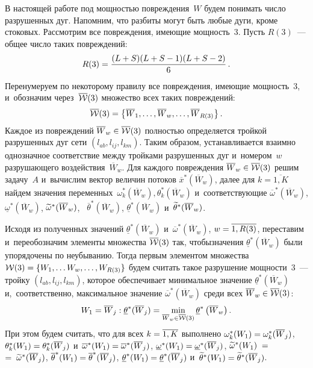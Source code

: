 \begin{multicols}{2}
В настоящей работе под мощностью повреждения~$W$ будем 
понимать число разрушенных дуг. Напомним, что разбиты могут быть любые дуги, 
кроме стоковых. Рассмотрим все повреждения, имеющие мощность~3.
Пусть $R(3)$~--- общее число таких повреждений:
$$
R(3) = \displaystyle\frac{\displaystyle (L+S) (L+S - 1) (L+S - 2)\mathstrut}{\displaystyle 6\mathstrut}\,. 
$$
Перенумеруем по некоторому правилу все по\-вреж\-де\-ния, имеющие мощность~3, 
и~обозначим через~$\overline{\cal W}(3)$ множество  всех таких повреждений: 
$$
\overline{\cal W}(3) = \left\{ \overline W_1, \ldots, 
\overline {W}_w, \ldots, \overline {W}_{R(3)}\right\}. 
$$
Каждое из повреждений $\overline {W}_w \hm\in \overline{\cal W}(3)$ 
пол\-ностью определяется тройкой разрушенных дуг сети $(l_{ab}, l_{ij}, l_{km})$.
Таким образом, устанавливается  взаимно однозначное соответствие между 
тройками разрушенных дуг и~номером~$w$ разрушающего воздействия~$\overline {W}_w$.
Для каждого повреждения $\overline {W}_w \hm\in \overline{\cal W}(3)$ решим задачу~$A$ и~вычислим вектор величин потоков $\overline {x}^*(\overline {W}_w)$, 
далее для $k = \overline{1, K}$ найдем значения переменных~$\omega_k^*(\overline{W}_w), 
\theta_k^*(\overline{W}_w)$  и~со\-от\-вет\-ст\-ву\-ющие $\overline {\omega}^*
(\overline {W}_w)$,  $\underline{\omega}^*(\overline {W}_w)$, 
$\widetilde {\omega}^*(\overline{W}_w)$, \ $\overline {\theta}^*(\overline {W}_w)$, 
$\underline {\theta}^*(\overline {W}_w)$ и~$\widetilde {\theta}^*(\overline {W}_w)$.

Исходя из полученных значений $\underline {\theta}^*(\overline {W}_w)$ 
и~$\overline {\omega}^*(\overline {W}_w)$, $w \hm= \overline{1, R(3)}$, 
переставим и~пе\-ре\-обозначим элементы множества $\overline{\cal W}(3)$ 
так, чтобы\linebreak значения $\underline {\theta}^*(\overline {W}_w)$ 
были упорядочены по неубыванию. Тогда первым элементом множества 
${\cal W}(3) \hm= \{ W_1, \ldots W_w, \ldots, W_{R(3)} \}$ 
будем считать такое разрушение мощности~3~--- тройку $(l_{ab}, l_{ij}, l_{km})$,\linebreak 
которое обеспечивает минимальное значение $\underline {\theta}^*(\overline {W}_w)$ 
и,~соответственно, максимальное значение $\overline {\omega}^*(\overline {W}_w)$ 
среди всех $\overline {W}_w \in \overline{\cal W}(3)$:
$$
W_1 = \overline {W}_j:  \underline {\theta}^*(\overline {W}_j) = 
\min\limits_{\overline {W}_w \in \overline{\cal W}(3)} \underline {\theta}^*
\left(\overline {W}_w\right). 
$$
При этом будем считать, что для всех $k \hm= \overline{1, K}$   
выполнено  $\omega_k^*(W_1) \hm= \omega_k^*(\overline {W}_{j})$, 
$\theta_k^*( W_1) \hm= \theta_k^*(\overline {W}_{j})$
и~$\overline {\omega}^*(W_1) \hm= \overline {\omega}^*(\overline {W}_{j})$, 
$\underline {\omega}^*( W_1)\hm = \underline {\omega}^*(\overline {W}_{j})$, 
$\widetilde {\omega}^*(W_{1})\;=$
$=\;\widetilde {\omega}^*(\overline {W}_{j})$, 
$\overline {\theta}^*(W_{1}) \hm= \overline {\theta}^*(\overline {W}_{j})$, 
$\underline {\theta}^*(W_{1}) \hm= \underline {\theta}^*(\overline {W}_{j})$ 
и~$\wl {\theta}^*( W_{1}) \hm= \wl {\theta}^*(\overline {W}_{j})$.


\end{multicols}
